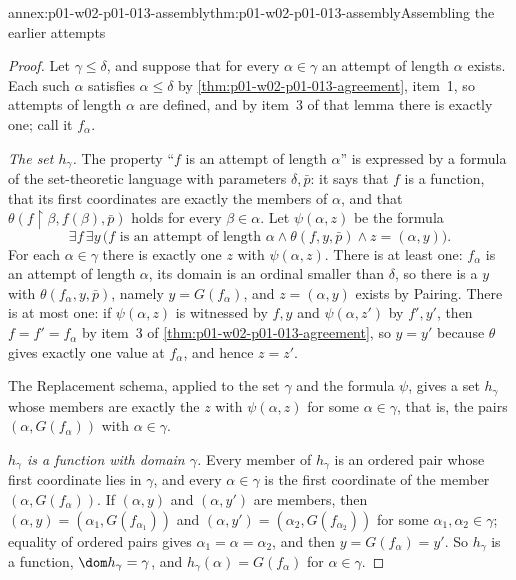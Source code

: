 \begin{annexitem}{annex:p01-w02-p01-013-assembly}{thm:p01-w02-p01-013-assembly}{Assembling the earlier attempts}
\begin{proof}
Let \(\gamma\leq\delta\), and suppose that for every \(\alpha\in\gamma\) an
attempt of length \(\alpha\) exists. Each such \(\alpha\) satisfies
\(\alpha\leq\delta\) by \cref{thm:p01-w02-p01-013-agreement}, item~1, so
attempts of length \(\alpha\) are defined, and by item~3 of that lemma there
is exactly one; call it \(f_\alpha\).

\emph{The set \(h_\gamma\).} The property ``\(f\) is an attempt of length
\(\alpha\)'' is expressed by a formula of the set-theoretic language with
parameters \(\delta,\bar p\): it says that \(f\) is a function, that its
first coordinates are exactly the members of \(\alpha\), and that
\(\theta(f\mathbin{\upharpoonright}\beta,f(\beta),\bar p)\) holds for every
\(\beta\in\alpha\). Let \(\psi(\alpha,z)\) be the formula
\[
  \exists f\,\exists y\,\bigl(f\text{ is an attempt of length }\alpha
  \land\theta(f,y,\bar p)\land z=(\alpha,y)\bigr).
\]
For each \(\alpha\in\gamma\) there is exactly one \(z\) with
\(\psi(\alpha,z)\). There is at least one: \(f_\alpha\) is an attempt of
length \(\alpha\), its domain is an ordinal smaller than \(\delta\), so there
is a \(y\) with \(\theta(f_\alpha,y,\bar p)\), namely \(y=G(f_\alpha)\), and
\(z=(\alpha,y)\) exists by Pairing. There is at most one: if
\(\psi(\alpha,z)\) is witnessed by \(f,y\) and \(\psi(\alpha,z')\) by
\(f',y'\), then \(f=f'=f_\alpha\) by item~3 of
\cref{thm:p01-w02-p01-013-agreement}, so \(y=y'\) because \(\theta\) gives
exactly one value at \(f_\alpha\), and hence \(z=z'\).

The Replacement schema, applied to the set \(\gamma\) and the formula
\(\psi\), gives a set \(h_\gamma\) whose members are exactly the \(z\) with
\(\psi(\alpha,z)\) for some \(\alpha\in\gamma\), that is, the pairs
\((\alpha,G(f_\alpha))\) with \(\alpha\in\gamma\).

\emph{\(h_\gamma\) is a function with domain \(\gamma\).} Every member of
\(h_\gamma\) is an ordered pair whose first coordinate lies in \(\gamma\),
and every \(\alpha\in\gamma\) is the first coordinate of the member
\((\alpha,G(f_\alpha))\). If \((\alpha,y)\) and \((\alpha,y')\) are members,
then \((\alpha,y)=(\alpha_1,G(f_{\alpha_1}))\) and
\((\alpha,y')=(\alpha_2,G(f_{\alpha_2}))\) for some
\(\alpha_1,\alpha_2\in\gamma\); equality of ordered pairs gives
\(\alpha_1=\alpha=\alpha_2\), and then \(y=G(f_\alpha)=y'\). So \(h_\gamma\)
is a function, \(\dom h_\gamma=\gamma\), and \(h_\gamma(\alpha)=G(f_\alpha)\)
for \(\alpha\in\gamma\).


\end{proof}
\end{annexitem}
